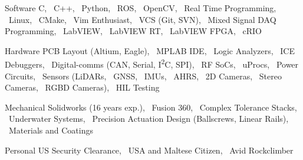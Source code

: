 
\begin{cvskills}

  \cvskill%
      {Software}
      {
            C,  
            \ C++,  
            \ Python,  
            \ ROS,  
            \ OpenCV,  
            \ Real Time Programming,  
            \ Linux,  
            \ CMake,  
            \ Vim Enthusiast,
            \ VCS (Git, SVN),  
            \ Mixed Signal DAQ Programming,  
            \ LabVIEW,  
            \ LabVIEW RT,  
            \ LabVIEW FPGA,  
            \ cRIO
        }

  \cvskill%
      {Hardware} 
      {
            PCB Layout (Altium, Eagle),
            \ MPLAB IDE, 
            \ Logic Analyzers, 
            \ ICE Debuggers, 
            \ Digital-comms (CAN, Serial, I\textsuperscript{2}C, SPI),
            \ RF SoCs, 
            \ uProcs, 
            \ Power Circuits, 
            \ Sensors (LiDARs, 
            \ GNSS, 
            \ IMUs, 
            \ AHRS, 
            \ 2D Cameras, 
            \ Stereo Cameras,  
            \ RGBD Cameras),
            \ HIL Testing
      }

  \cvskill%
      {Mechanical}
      {
            Solidworks (16 years exp.),
            \ Fusion 360,
            \ Complex Tolerance Stacks,
            \ Underwater Systems,
            \ Precision Actuation Design (Ballscrews, Linear Rails), 
            \ Materials and Coatings
      }

  \cvskill%
      {Personal}
      {
            US Security Clearance, 
            \ USA and Maltese Citizen, 
            \ Avid Rockclimber
      }

\end{cvskills}
